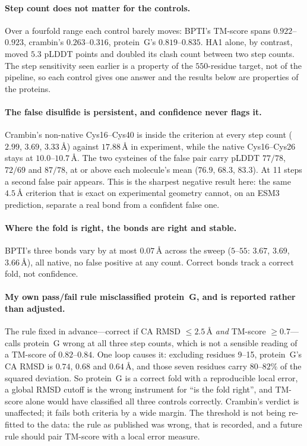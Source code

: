 \documentclass[11pt,a4paper]{article}
\newcommand{\ang}{\,\mbox{\AA}}
\begin{document}
\paragraph{Step count does not matter for the controls.} Over a fourfold range
each control barely moves: BPTI's TM-score spans $0.922$--$0.923$, crambin's
$0.263$--$0.316$, protein~G's $0.819$--$0.835$. HA1 alone, by contrast, moved
$5.3$ pLDDT points and doubled its clash count between two step counts. The step
sensitivity seen earlier is a property of the $550$-residue target, not of the
pipeline, so each control gives one answer and the results below are properties
of the proteins.

\paragraph{The false disulfide is persistent, and confidence never flags it.}
Crambin's non-native Cys16--Cys40 is inside the criterion at every step count
($2.99$, $3.69$, $3.33\ang$) against $17.88\ang$ in experiment, while the native
Cys16--Cys26 stays at $10.0$--$10.7\ang$. The two cysteines of the false pair
carry pLDDT $77/78$, $72/69$ and $87/78$, at or above each molecule's mean
($76.9$, $68.3$, $83.3$). At 11 steps a second false pair appears. This is the
sharpest negative result here: the same $4.5\ang$ criterion that is exact on
experimental geometry cannot, on an ESM3 prediction, separate a real bond from a
confident false one.

\paragraph{Where the fold is right, the bonds are right and stable.} BPTI's three
bonds vary by at most $0.07\ang$ across the sweep ($5$--$55$: $3.67$, $3.69$,
$3.66\ang$), all native, no false positive at any count. Correct bonds track a
correct fold, not confidence.

\paragraph{My own pass/fail rule misclassified protein~G, and is reported rather
than adjusted.} The rule fixed in advance---correct if CA RMSD $\le 2.5\ang$
\emph{and} TM-score $\ge 0.7$---calls protein~G wrong at all three step counts,
which is not a sensible reading of a TM-score of $0.82$--$0.84$. One loop causes
it: excluding residues 9--15, protein~G's CA RMSD is $0.74$, $0.68$ and
$0.64\ang$, and those seven residues carry $80$--$82\%$ of the squared deviation.
So protein~G is a correct fold with a reproducible local error, a global RMSD
cutoff is the wrong instrument for ``is the fold right'', and TM-score alone
would have classified all three controls correctly. Crambin's verdict is
unaffected; it fails both criteria by a wide margin. The threshold is not being
re-fitted to the data: the rule as published was wrong, that is recorded, and a
future rule should pair TM-score with a local error measure.
\end{document}
